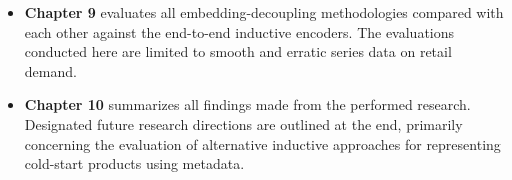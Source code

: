 \begin{itemize}
\item \textbf{Chapter 9} evaluates all embedding-decoupling methodologies compared with each other against the end-to-end inductive encoders. The evaluations conducted here are limited to smooth and erratic series data on retail demand.
\item \textbf{Chapter 10} summarizes all findings made from the performed research. Designated future research directions are outlined at the end, primarily concerning the evaluation of alternative inductive approaches for representing cold-start products using metadata.
\end{itemize}

